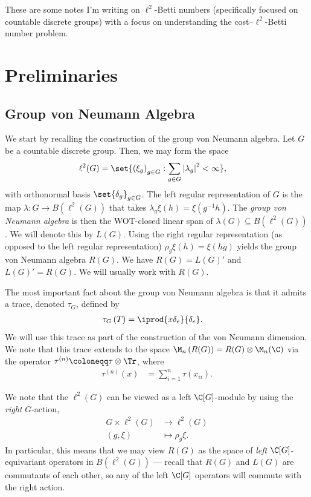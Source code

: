 \documentclass[10pt]{mypackage}
\renewcommand{\coloneq}{\coloneqq}
\begin{document}
\RaggedRight
These are some notes I'm writing on $\ell^2$-Betti numbers (specifically focused on countable discrete groups) with a focus on understanding the cost--$\ell^2$-Betti number problem.
\section{Preliminaries}%
\subsection{Group von Neumann Algebra}%
We start by recalling the construction of the group von Neumann algebra. Let $G$ be a countable discrete group. Then, we may form the space
\begin{align*}
  \ell^2(G) &= \set{\left( \xi_g \right)_{g\in G} : \sum_{g\in G} \left\vert \lambda_g \right\vert^2 < \infty},
\end{align*}
with orthonormal basis $\set{\delta_g}_{g\in G}$. The left regular representation of $G$ is the map $\lambda\colon G\rightarrow B\left( \ell^2(G) \right)$ that takes $\lambda_g\xi(h) = \xi\left( g^{-1}h \right)$. The \textit{group von Neumann algebra} is then the WOT-closed linear span of $\lambda(G)\subseteq B\left( \ell^2(G) \right)$. We will denote this by $L(G)$. Using the right regular representation (as opposed to the left regular representation) $\rho_g\xi(h) = \xi(hg)$ yields the group von Neumann algebra $R(G)$. We have $R(G) = L(G)'$ and $L(G)' = R(G)$. We will usually work with $R(G)$.

The most important fact about the group von Neumann algebra is that it admits a trace, denoted $\tau_G$, defined by
\begin{align*}
  \tau_G\left( T\right) &= \iprod{x\delta_e}{\delta_e}.
\end{align*}
We will use this trace as part of the construction of the von Neumann dimension. We note that this trace extends to the space $\M_n\left( R(G) \right) = R(G)\otimes \M_n(\C)$ via the operator $\tau^{(n)}\coloneq \tau\otimes \Tr$, where
\begin{align*}
  \tau^{(n)}(x) &= \sum_{i=1}^{n} \tau\left( x_{ii} \right).
\end{align*}

We note that the $\ell^2(G)$ can be viewed as a left $\C[G]$-module by using the \textit{right} $G$-action,
\begin{align*}
  G\times \ell^2(G)&\rightarrow \ell^2(G)\\
  \left( g,\xi \right) &\mapsto \rho_g\xi.
\end{align*}
In particular, this means that we may view $R(G)$ as the space of \textit{left} $\C[G]$-equivariant operators in $B\left( \ell^2(G) \right)$ --- recall that $R(G)$ and $L(G)$ are commutants of each other, so any of the left $\C[G]$ operators will commute with the right action.
\end{document}
